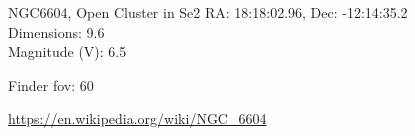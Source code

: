 \begin{block}{NGC6604, Open Cluster in Se2}
    RA: 18:18:02.96, Dec: -12:14:35.2 \\ 
    Dimensions: 9.6 \\ 
    Magnitude (V): 6.5



    Finder fov: 60 

    \url{https://en.wikipedia.org/wiki/NGC_6604} 
\end{block}